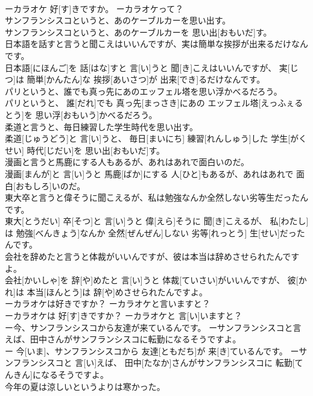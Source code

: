 \documentclass[8pt]{extreport}
\begin{document}
\begin{CJK}{UTF8}{min}
\\	ーカラオケ 好[す]きですか。 ーカラオケって？
\\	サンフランシスコというと、あのケーブルカーを思い出す。	
\\	サンフランシスコというと、あのケーブルカーを 思い出[おもいだ]す。
\\	日本語を話すと言うと聞こえはいいんですが、実は簡単な挨拶が出来るだけなんです。	
\\	日本語[にほんご]を 話[はな]すと 言[い]うと 聞[き]こえはいいんですが、 実[じつ]は 簡単[かんたん]な 挨拶[あいさつ]が 出来[でき]るだけなんです。
\\	パリというと、誰でも真っ先にあのエッフェル塔を思い浮かべるだろう。	
\\	パリというと、 誰[だれ]でも 真っ先[まっさき]にあの エッフェル塔[えっふぇるとう]を 思い浮[おもいう]かべるだろう。
\\	柔道と言うと、毎日練習した学生時代を思い出す。	
\\	柔道[じゅうどう]と 言[い]うと、 毎日[まいにち] 練習[れんしゅう]した 学生[がくせい] 時代[じだい]を 思い出[おもいだ]す。
\\	漫画と言うと馬鹿にする人もあるが、あれはあれで面白いのだ。	
\\	漫画[まんが]と 言[い]うと 馬鹿[ばか]にする 人[ひと]もあるが、あれはあれで 面白[おもしろ]いのだ。
\\	東大卒と言うと偉そうに聞こえるが、私は勉強なんか全然しない劣等生だったんです。	
\\	東大[とうだい] 卒[そつ]と 言[い]うと 偉[えら]そうに 聞[き]こえるが、 私[わたし]は 勉強[べんきょう]なんか 全然[ぜんぜん]しない 劣等[れっとう] 生[せい]だったんです。
\\	会社を辞めたと言うと体裁がいいんですが、彼は本当は辞めさせられたんですよ。	
\\	会社[かいしゃ]を 辞[や]めたと 言[い]うと 体裁[ていさい]がいいんですが、 彼[かれ]は 本当[ほんとう]は 辞[や]めさせられたんですよ。
\\	ーカラオケは好きですか？ ーカラオケと言いますと？	
\\	ーカラオケは 好[す]きですか？ ーカラオケと 言[い]いますと？
\\	ー今、サンフランシスコから友達が来ているんです。 ーサンフランシスコと言えば、田中さんがサンフランシスコに転勤になるそうですよ。	
\\	ー 今[いま]、サンフランシスコから 友達[ともだち]が 来[き]ているんです。 ーサンフランシスコと 言[い]えば、 田中[たなか]さんがサンフランシスコに 転勤[てんきん]になるそうですよ。
\\	今年の夏は涼しいというよりは寒かった。	

\end{CJK}
\end{document}
